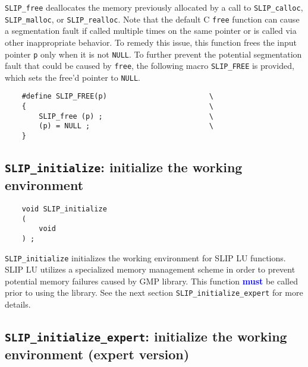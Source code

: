 \documentclass[12pt]{article}
\theoremstyle{definition}
\begin{document}
\verb|SLIP_free| deallocates the memory previously allocated by a call to
\verb|SLIP_calloc|, \verb|SLIP_malloc|, or \verb|SLIP_realloc|. Note that the
default C \verb|free| function can cause a segmentation fault if called
multiple times on the same pointer or is called via other inappropriate
behavior. To remedy this issue, this function frees the input pointer \verb|p|
only when it is not \verb|NULL|. To further prevent the potential segmentation
fault that could be caused by \verb|free|, the following macro \verb|SLIP_FREE|
is provided, which sets the free'd pointer to \verb|NULL|.

\begin{mdframed}[userdefinedwidth=6in]
{\footnotesize
\begin{verbatim}
    #define SLIP_FREE(p)                        \
    {                                           \
        SLIP_free (p) ;                         \
        (p) = NULL ;                            \
    }
\end{verbatim}
} \end{mdframed}

\cprotect\subsection{\verb|SLIP_initialize|: initialize the working environment}

\begin{mdframed}[userdefinedwidth=6in]
{\footnotesize
\begin{verbatim}
    void SLIP_initialize
    (
        void
    ) ;
\end{verbatim}
} \end{mdframed}

\verb|SLIP_initialize| initializes the working environment for SLIP LU
functions. SLIP LU utilizes a specialized memory management scheme in order to
prevent potential memory failures caused by GMP library. This function
\textcolor{blue}{\textbf{must}} be called prior to using the library. See the
next section \verb|SLIP_initialize_expert| for more details.

\cprotect\subsection{\verb|SLIP_initialize_expert|: initialize the working environment (expert version)}\label{ss:SLIP_initialize_expert}
\end{document}
